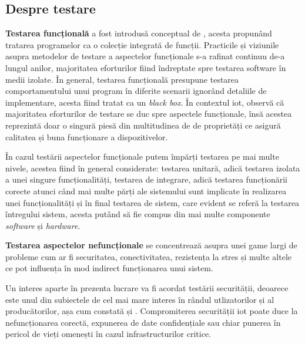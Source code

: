 
\subsection{Despre testare}


\textbf{Testarea funcțională} a fost introdusă conceptual de \cite{Howden1980}, acesta propunând tratarea programelor ca o colecție integrată de funcții. Practicile și viziunile asupra metodelor de testare a aspectelor funcționale s-a rafinat continuu de-a lungul anilor, majoritatea eforturilor fiind îndreptate spre testarea software în medii izolate. În general, testarea funcțională presupune testarea comportamentului unui program în diferite scenarii ignorând detaliile de implementare, acesta fiind tratat ca un \textit{black box}. În contextul \acrshort{iot}, \cite{Corts2019} observă că majoritatea eforturilor de testare se duc spre aspectele funcționale, însă acestea reprezintă doar o singură piesă din multitudinea de de proprietăți ce asigură calitatea și buna funcționare a dispozitivelor.

În cazul testării aspectelor funcționale putem împărți testarea pe mai multe nivele, acestea fiind în general considerate: testarea unitară, adică testarea izolata a unei singure funcționalități, testarea de integrare, adică testarea funcționării corecte atunci când mai multe părți ale sistemului sunt implicate în realizarea unei funcționalități și în final testarea de sistem, care evident se referă la testarea întregului sistem, acesta putând să fie compus din mai multe componente \textit{software} și \textit{hardware}.

\textbf{Testarea aspectelor nefuncționale} se concentrează asupra unei game largi de probleme cum ar fi securitatea, conectivitatea, rezistența la stres și multe altele ce pot influența în mod indirect funcționarea unui sistem.


Un interes aparte în prezenta lucrare va fi acordat testării securității, deoarece este unul din subiectele de cel mai mare interes în rândul utlizatorilor și al producătorilor, așa cum constată \cite{Ahmed2019} și \cite{Lee2015}. Compromiterea securității \acrshort{iot} poate duce la nefuncționarea corectă, expunerea de date confidențiale sau chiar punerea în pericol de vieți omenești în cazul infrastructurilor critice.

